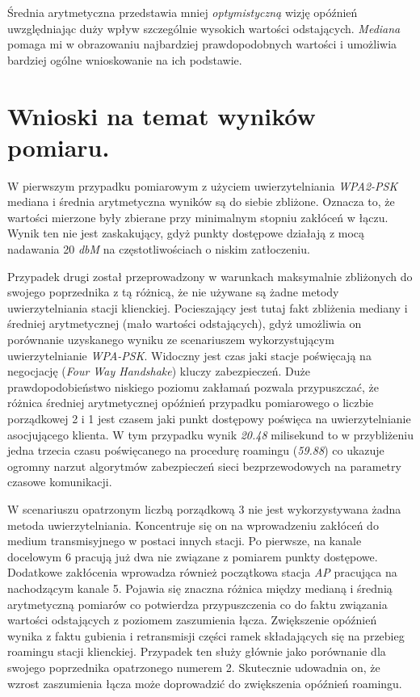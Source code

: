 Średnia arytmetyczna przedstawia mniej \emph{optymistyczną} wizję opóźnień uwzględniając duży wpływ szczególnie wysokich wartości odstających. \emph{Mediana} pomaga mi w obrazowaniu najbardziej prawdopodobnych wartości i umożliwia bardziej ogólne wnioskowanie na ich podstawie.

\section{Wnioski na temat wyników pomiaru.}

W pierwszym przypadku pomiarowym z użyciem uwierzytelniania \emph{WPA2-PSK} mediana i średnia arytmetyczna wyników są do siebie zbliżone. Oznacza to, że wartości mierzone były zbierane przy minimalnym stopniu zakłóceń w łączu. Wynik ten nie jest zaskakujący, gdyż punkty dostępowe działają z mocą nadawania 20 \emph{dbM} na częstotliwościach o niskim zatłoczeniu.

Przypadek drugi został przeprowadzony w warunkach maksymalnie zbliżonych do swojego poprzednika z tą różnicą, że nie używane są żadne metody uwierzytelniania stacji klienckiej. Pocieszający jest tutaj fakt zbliżenia mediany i średniej arytmetycznej (mało wartości odstających), gdyż umożliwia on porównanie uzyskanego wyniku ze scenariuszem wykorzystującym uwierzytelnianie \emph{WPA-PSK}. Widoczny jest czas jaki stacje poświęcają na negocjację (\emph{Four Way Handshake}) kluczy zabezpieczeń. Duże prawdopodobieństwo niskiego poziomu zakłamań pozwala przypuszczać, że różnica średniej arytmetycznej opóźnień przypadku pomiarowego o liczbie porządkowej 2 i 1 jest czasem jaki punkt dostępowy poświęca na uwierzytelnianie asocjującego klienta. W tym przypadku wynik \emph{20.48} milisekund to w przybliżeniu jedna trzecia czasu poświęcanego na procedurę roamingu (\emph{59.88}) co ukazuje ogromny narzut algorytmów zabezpieczeń sieci bezprzewodowych na parametry czasowe komunikacji.

W scenariuszu opatrzonym liczbą porządkową 3 nie jest wykorzystywana żadna metoda uwierzytelniania. Koncentruje się on na wprowadzeniu zakłóceń do medium transmisyjnego w postaci innych stacji. Po pierwsze, na kanale docelowym 6 pracują już dwa nie związane z pomiarem punkty dostępowe. Dodatkowe zakłócenia wprowadza również początkowa stacja \emph{AP} pracująca na nachodzącym kanale 5. Pojawia się znaczna różnica między medianą i średnią arytmetyczną pomiarów co potwierdza przypuszczenia co do faktu związania wartości odstających z poziomem zaszumienia łącza. Zwiększenie opóźnień wynika z faktu gubienia i retransmisji części ramek składających się na przebieg roamingu stacji klienckiej. Przypadek ten służy głównie jako porównanie dla swojego poprzednika opatrzonego numerem 2. Skutecznie udowadnia on, że wzrost zaszumienia łącza może doprowadzić do zwiększenia opóźnień roamingu.

